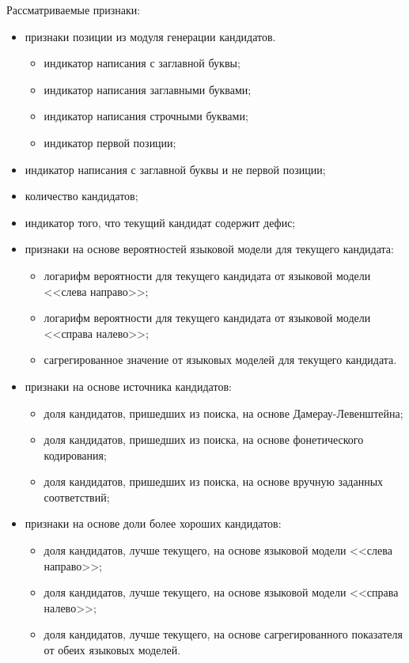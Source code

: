 Рассматриваемые признаки:
\begin{itemize}
	\item признаки позиции из модуля генерации кандидатов.
	\begin{itemize}
		\item индикатор написания с заглавной буквы;
		\item индикатор написания заглавными буквами;
		\item индикатор написания строчными буквами;
		\item индикатор первой позиции;
	\end{itemize}
	\item индикатор написания с заглавной буквы и не первой позиции;
	\item количество кандидатов;
	\item индикатор того, что текущий кандидат содержит дефис;
	\item признаки на основе вероятностей языковой модели для текущего кандидата:
	\begin{itemize}
		\item логарифм вероятности для текущего кандидата от языковой модели <<слева направо>>;
		\item логарифм вероятности для текущего кандидата от языковой модели <<справа налево>>;
		\item сагрегированное значение от языковых моделей для текущего кандидата.
	\end{itemize}
	\item признаки на основе источника кандидатов:
	\begin{itemize}
		\item доля кандидатов, пришедших из поиска, на основе Дамерау-Левенштейна;
		\item доля кандидатов, пришедших из поиска, на основе фонетического кодирования;
		\item доля кандидатов, пришедших из поиска, на основе вручную заданных соответствий;
	\end{itemize}
	\item признаки на основе доли более хороших кандидатов:
	\begin{itemize}
		\item доля кандидатов, лучше текущего, на основе языковой модели <<слева направо>>;
		\item доля кандидатов, лучше текущего, на основе языковой модели <<справа налево>>;
		\item доля кандидатов, лучше текущего, на основе сагрегированного показателя от обеих языковых моделей.

\end{itemize}
\end{itemize}

